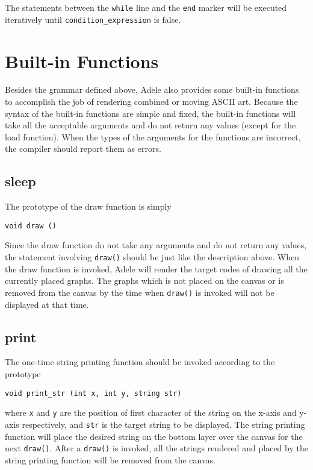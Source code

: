 \documentclass[11pt,letterpaper]{article}
\begin{document}
The statements between the \texttt{while} line and the \texttt{end} marker will be executed iteratively until \texttt{condition\_expression} is false.

\section {Built-in Functions}
Besides the grammar defined above, Adele also provides some built-in functions to accomplish the job of rendering combined or moving ASCII art. Because the syntax of the built-in functions are simple and fixed, the built-in functions will take all the acceptable arguments and do not return any values (except for the load function). When the types of the arguments for the functions are incorrect, the compiler should report them as errors.

\subsection {sleep}
The prototype of the draw function is simply
\begin{lstlisting}[tabsize=4]
	void draw ()
\end{lstlisting}
Since the draw function do not take any arguments and do not return any values, the statement involving \texttt{draw()} should be just like the description above. When the draw function is invoked, Adele will render the target codes of drawing all the currently placed graphs. The graphs which is not placed on the canvas or is removed from the canvas by the time when \texttt{draw()} is invoked will not be displayed at that time.

\subsection {print}
The one-time string printing function should be invoked according to the prototype
\begin{lstlisting}[tabsize=4]
	void print_str (int x, int y, string str)
\end{lstlisting}
where \texttt{x} and \texttt{y} are the position of first character of the string on the x-axis and y-axis respectively, and \texttt{str} is the target string to be displayed. The string printing function will place the desired string on the bottom layer over the canvas for the next \texttt{draw()}. After a \texttt{draw()} is invoked, all the strings rendered and placed by the string printing function will be removed from the canvas.
\end{document}

